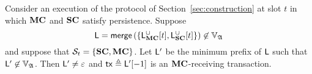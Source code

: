 


\begin{lemma}\label{lem:firewall-tx-types}
  Consider an execution of the protocol of Section~\ref{sec:construction} at
  slot $t$ in
  which $\mathbf{MC}$ and $\mathbf{SC}$ satisfy persistence.
  Suppose
  $$
    \mathsf{L} =
    \mathsf{merge}\left(
        \{\mathsf{L}_{\mathbf{MC}}^{\cup}[t], \mathsf{L}_{\mathbf{SC}}^{\cup}[t]\}
    \right)
    \not\in
    \mathbb{V}_{\mathfrak{A}}
  $$
  and suppose that $\mathcal{S}_t = \{\mathbf{SC}, \mathbf{MC}\}$.
  Let $\mathsf{L}'$ be the minimum prefix of $\mathsf{L}$ such that
  $\mathsf{L}' \not\in \mathbb{V}_{\mathfrak{A}}$. Then
  $\mathsf{L}'\neq\varepsilon$ and
  $\mathsf{tx} \triangleq \mathsf{L}'[-1]$
  is an $\mathbf{MC}$-receiving transaction.
\end{lemma}

